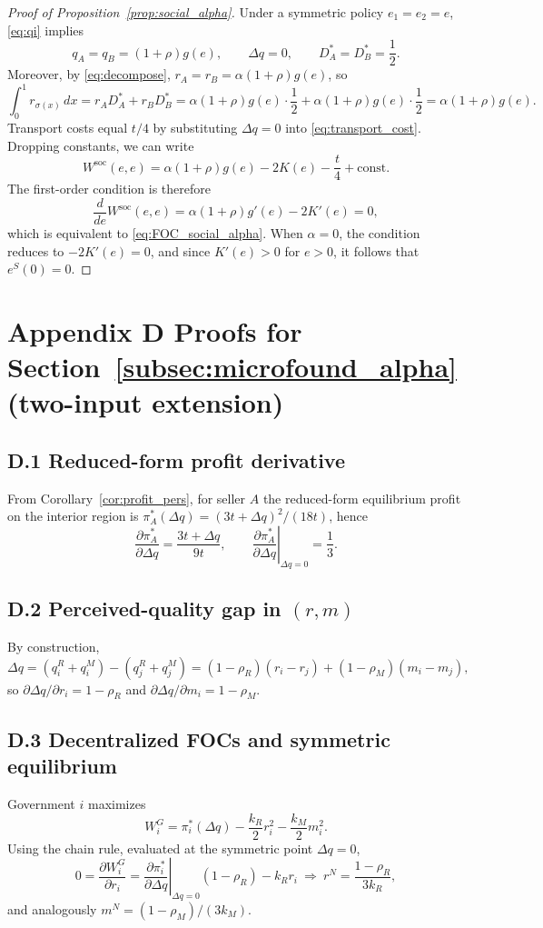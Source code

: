 \begin{proof}[Proof of Proposition~\ref{prop:social_alpha}]
\label{app:proof-social}
Under a symmetric policy $e_1=e_2=e$, \eqref{eq:qi} implies
\[
q_A=q_B=(1+\rho)g(e),
\qquad
\Delta q=0,
\qquad
D_A^*=D_B^*=\frac12.
\]
Moreover, by \eqref{eq:decompose}, $r_A=r_B=\alpha(1+\rho)g(e)$, so
\[
\int_0^1 r_{\sigma(x)}\,dx
=r_A D_A^*+r_B D_B^*
=\alpha(1+\rho)g(e)\cdot \frac12+\alpha(1+\rho)g(e)\cdot \frac12
=\alpha(1+\rho)g(e).
\]
Transport costs equal $t/4$ by substituting $\Delta q=0$ into \eqref{eq:transport_cost}. Dropping constants, we can write
\[
W^{\mathrm{soc}}(e,e)=\alpha(1+\rho)g(e)-2K(e)-\frac{t}{4}+\text{const}.
\]
The first-order condition is therefore
\[
\frac{d}{de}W^{\mathrm{soc}}(e,e)=\alpha(1+\rho)g'(e)-2K'(e)=0,
\]
which is equivalent to \eqref{eq:FOC_social_alpha}. When $\alpha=0$, the condition reduces to $-2K'(e)=0$, and since $K'(e)>0$ for $e>0$, it follows that $e^{S}(0)=0$.
\end{proof}
\section*{Appendix D Proofs for Section~\ref{subsec:microfound_alpha} (two-input extension)}

\subsection*{D.1 Reduced-form profit derivative}
From Corollary~\ref{cor:profit_pers}, for seller $A$ the reduced-form equilibrium profit on the interior region is $\pi_A^*(\Delta q)=(3t+\Delta q)^2/(18t)$, hence
\[
\frac{\partial \pi_A^*}{\partial \Delta q}=\frac{3t+\Delta q}{9t},\qquad
\left.\frac{\partial \pi_A^*}{\partial \Delta q}\right|_{\Delta q=0}=\frac13.
\]

\subsection*{D.2 Perceived-quality gap in $(r,m)$}
By construction,
\[
\Delta q = (q_i^R+q_i^M)-(q_j^R+q_j^M)
=(1-\rho_R)(r_i-r_j)+(1-\rho_M)(m_i-m_j),
\]
so $\partial \Delta q/\partial r_i=1-\rho_R$ and $\partial \Delta q/\partial m_i=1-\rho_M$.

\subsection*{D.3 Decentralized FOCs and symmetric equilibrium}
Government $i$ maximizes
\[
W_i^G=\pi_i^*(\Delta q)-\frac{k_R}{2}r_i^2-\frac{k_M}{2}m_i^2.
\]
Using the chain rule, evaluated at the symmetric point $\Delta q=0$,
\[
0=\frac{\partial W_i^G}{\partial r_i}
=\left.\frac{\partial \pi_i^*}{\partial \Delta q}\right|_{\Delta q=0}(1-\rho_R)-k_R r_i
\ \Rightarrow\ r^N=\frac{1-\rho_R}{3k_R},
\]
and analogously $m^N=(1-\rho_M)/(3k_M)$.

